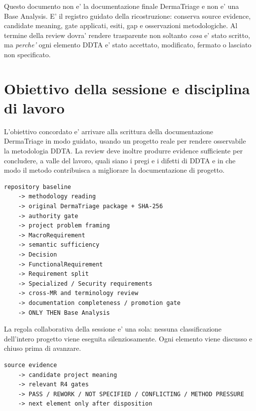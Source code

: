 \documentclass[11pt,a4paper]{article}
\begin{document}
\begin{titlepage}
\vfill
\begin{ddtaprinciple}[title={Ruolo di questo artifact}]
Questo documento non e' la documentazione finale DermaTriage e non e' una Base Analysis. E' il registro guidato della ricostruzione: conserva source evidence, candidate meaning, gate applicati, esiti, gap e osservazioni metodologiche. Al termine della review dovra' rendere trasparente non soltanto \emph{cosa} e' stato scritto, ma \emph{perche'} ogni elemento DDTA e' stato accettato, modificato, fermato o lasciato non specificato.
\end{ddtaprinciple}
\end{titlepage}

\tableofcontents
\clearpage

\section{Obiettivo della sessione e disciplina di lavoro}

L'obiettivo concordato e' arrivare alla scrittura della documentazione DermaTriage in modo guidato, usando un progetto reale per rendere osservabile la metodologia DDTA. La review deve inoltre produrre evidence sufficiente per concludere, a valle del lavoro, quali siano i pregi e i difetti di DDTA e in che modo il metodo contribuisca a migliorare la documentazione di progetto.

\begin{ddtacore}[title={Sequenza autorizzata}]
\begin{lstlisting}
repository baseline
    -> methodology reading
    -> original DermaTriage package + SHA-256
    -> authority gate
    -> project problem framing
    -> MacroRequirement
    -> semantic sufficiency
    -> Decision
    -> FunctionalRequirement
    -> Requirement split
    -> Specialized / Security requirements
    -> cross-MR and terminology review
    -> documentation completeness / promotion gate
    -> ONLY THEN Base Analysis
\end{lstlisting}
\end{ddtacore}

La regola collaborativa della sessione e' una sola: nessuna classificazione dell'intero progetto viene eseguita silenziosamente. Ogni elemento viene discusso e chiuso prima di avanzare.

\begin{lstlisting}
source evidence
    -> candidate project meaning
    -> relevant R4 gates
    -> PASS / REWORK / NOT SPECIFIED / CONFLICTING / METHOD PRESSURE
    -> next element only after disposition
\end{lstlisting}
\end{document}
